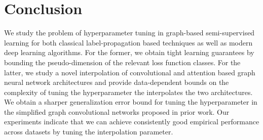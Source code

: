 \section{Conclusion}
We study the problem of hyperparameter tuning in graph-based semi-supervised learning for both classical label-propagation based techniques as well as modern deep learning algorithms. For the former, we obtain tight learning guarantees by bounding the pseudo-dimension of the relevant loss function classes. For the latter, we study a novel interpolation of convolutional and attention based graph neural network architectures and provide data-dependent bounds on the complexity of tuning the  hyperparameter the interpolates the two architectures. We obtain a sharper generalization error bound for tuning the hyperparameter in the simplified graph convolutional networks proposed in prior work. Our experiments indicate that we can achieve consistently good empirical performance across datasets by tuning the interpolation parameter.